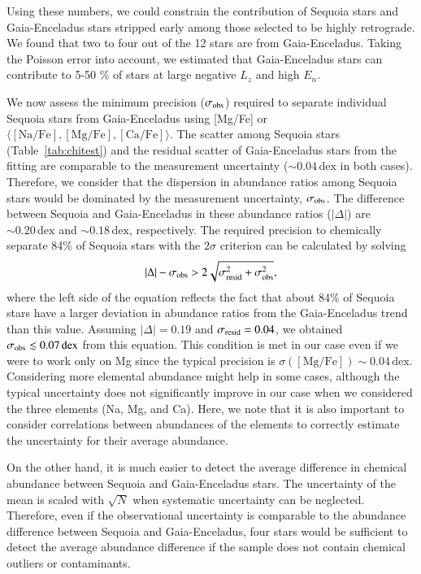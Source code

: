 \documentclass{aa}
\begin{document}
Using these numbers, we could constrain the contribution of Sequoia stars and Gaia-Enceladus stars stripped early \citep{Koppelman2019a} among those selected to be highly retrograde.
We found that two to four out of the 12 stars are from Gaia-Enceladus.
Taking the Poisson error into account, we estimated that Gaia-Enceladus stars can contribute to 5-50 \% of stars at large negative $L_z$ and high $E_n$.


We now assess the minimum precision ($\sigma_{\rm obs}$) required to separate individual Sequoia stars from Gaia-Enceladus using [{Mg}/{Fe}] or $\langle [\mathrm{Na/Fe}],[\mathrm{Mg/Fe}],[\mathrm{Ca/Fe}]\rangle$.
The scatter among Sequoia stars (Table~\ref{tab:chitest}) and the residual scatter of Gaia-Enceladus stars from the fitting are comparable to the measurement uncertainty ($\sim0.04\,\mathrm{dex}$ in both cases).
Therefore, we consider that the dispersion in abundance ratios among Sequoia stars would be dominated by the measurement uncertainty, $\sigma_{\rm obs}$.
The difference between Sequoia and Gaia-Enceladus in these abundance ratios ($|\Delta|$) are $\sim 0.20\,\mathrm{dex}$ and $\sim 0.18\,\mathrm{dex}$, respectively.
The required precision to chemically separate 84\% of Sequoia stars with the $2\sigma$ criterion can be calculated by solving 
\begin{equation}
|\Delta| - \sigma_{\rm obs}>2\sqrt{\sigma_{\rm resid}^2+\sigma_{\rm obs}^2},
\end{equation}
where the left side of the equation reflects the fact that about 84\% of Sequoia stars have a larger deviation in abundance ratios from the Gaia-Enceladus trend than this value.
Assuming $|\Delta|=0.19$ and $\sigma_{\rm resid}=0.04$, we obtained $\sigma_{\rm obs}\lesssim 0.07\,\mathrm{dex}$ from this equation.
This condition is met in our case even if we were to work only on Mg since the typical precision is $\sigma([\mathrm{Mg/Fe}])\sim 0.04\,\mathrm{dex}$. 
Considering more elemental abundance might help in some cases, although the typical uncertainty does not significantly improve in our case when we considered the three elements (Na, Mg, and Ca).
Here, we note that it is also important to consider correlations between abundances of the elements to correctly estimate the uncertainty for their average abundance.
 
On the other hand, it is much easier to detect the average difference in chemical abundance between Sequoia and Gaia-Enceladus stars.
The uncertainty of the mean is scaled with $\sqrt{N}$ when systematic uncertainty can be neglected.
Therefore, even if the observational uncertainty is comparable to the abundance difference between Sequoia and Gaia-Enceladus, four stars would be sufficient to detect the average abundance difference if the sample does not contain chemical outliers or contaminants.
\end{document}
